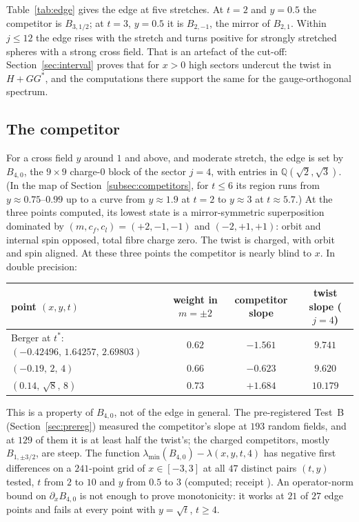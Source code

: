\documentclass[11pt]{article}
\theoremstyle{definition}
\theoremstyle{remark}
\begin{document}
Table~\ref{tab:edge} gives the edge at five stretches. At $t=2$ and $y=0.5$ the competitor is $B_{3,1/2}$; at $t=3$,
$y=0.5$ it is $B_{2,-1}$, the mirror of $B_{2,1}$. Within $j\le12$ the edge rises with the stretch and turns positive for
strongly stretched spheres with a strong cross field. That is an artefact of the cut-off: Section~\ref{sec:interval}
proves that for $x>0$ high sectors undercut the twist in $H+GG^*$, and the computations there support the same for the
gauge-orthogonal spectrum.

\subsection{The competitor}\label{subsec:competitor}

For a cross field $y$ around $1$ and above, and moderate stretch, the edge is set by $B_{4,0}$, the $9\times9$
charge-$0$ block of the sector $j=4$, with entries in $\mathbb Q(\sqrt2,\sqrt3)$. (In the map of
Section~\ref{subsec:competitors}, for $t\le6$ its region runs from $y\approx0.75$--$0.99$ up to a curve from
$y\approx1.9$ at $t=2$ to $y\approx3$ at $t\approx5.7$.) At the three points computed, its lowest state is a
mirror-symmetric superposition dominated by $(m,c_f,c_l)=(+2,-1,-1)$ and $(-2,+1,+1)$: orbit and internal spin opposed,
total fibre charge zero. The twist is charged, with orbit and spin aligned. At these three points the competitor is
nearly blind to $x$. In double precision:
\begin{center}
\small
\begin{tabular}{@{}lccc@{}}
\toprule
point $(x,y,t)$ & weight in $m=\pm2$ & competitor slope & twist slope ($j=4$)\\
\midrule
Berger at $t^*$: $(-0.42496,\,1.64257,\,2.69803)$ & $0.62$ & $-1.561$ & $9.741$\\
$(-0.19,\,2,\,4)$ & $0.66$ & $-0.623$ & $9.620$\\
$(0.14,\,\sqrt8,\,8)$ & $0.73$ & $+1.684$ & $10.179$\\
\bottomrule
\end{tabular}
\end{center}
This is a property of $B_{4,0}$, not of the edge in general. The pre-registered Test~B (Section~\ref{sec:prereg})
measured the competitor's slope at $193$ random fields, and at $129$ of them it is at least half the twist's; the
charged competitors, mostly $B_{1,\pm3/2}$, are steep. The function $\lambda_{\min}(B_{4,0})-\lambda(x,y,t,4)$ has negative
first differences on a $241$-point grid of $x\in[-3,3]$ at all $47$ distinct pairs $(t,y)$ tested, $t$ from $2$ to $10$
and $y$ from $0.5$ to $3$ (computed; receipt ). An operator-norm bound on $\partial_xB_{4,0}$
is not enough to prove monotonicity: it works at $21$ of $27$ edge points and fails at every point with $y=\sqrt t$,
$t\ge4$.
\end{document}
